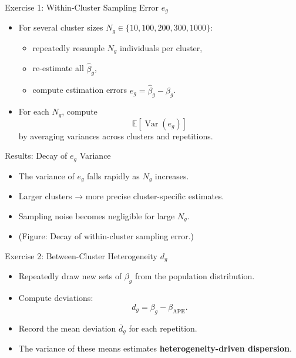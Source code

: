 \documentclass[
  ignorenonframetext,
]{beamer}
\providecommand{\tightlist}{%
  \setlength{\itemsep}{0pt}\setlength{\parskip}{0pt}}
\begin{document}
\begin{frame}{Exercise 1: Within-Cluster Sampling Error \(e_g\)}
\label{exercise-1-within-cluster-sampling-error-e_g}
\begin{itemize}
\tightlist
\item
  For several cluster sizes \(N_g \in \{10,100,200,300,1000\}\):

  \begin{itemize}
  \tightlist
  \item
    repeatedly resample \(N_g\) individuals per cluster,
  \item
    re-estimate all \(\hat{\beta}_g\),
  \item
    compute estimation errors \(e_g = \hat{\beta}_g - \beta_g\).
  \end{itemize}
\item
  For each \(N_g\), compute \[
  \mathbb{E}[\operatorname{Var}(e_g)]
  \] by averaging variances across clusters and repetitions.
\end{itemize}
\end{frame}

\begin{frame}{Results: Decay of \(e_g\) Variance}
\label{results-decay-of-e_g-variance}
\begin{itemize}
\tightlist
\item
  The variance of \(e_g\) falls rapidly as \(N_g\) increases.\\
\item
  Larger clusters → more precise cluster-specific estimates.\\
\item
  Sampling noise becomes negligible for large \(N_g\).\\
\item
  (Figure: Decay of within-cluster sampling error.)
\end{itemize}
\end{frame}

\begin{frame}{Exercise 2: Between-Cluster Heterogeneity \(d_g\)}
\label{exercise-2-between-cluster-heterogeneity-d_g}
\begin{itemize}
\tightlist
\item
  Repeatedly draw new sets of \(\beta_g\) from the population
  distribution.\\
\item
  Compute deviations: \[
  d_g = \beta_g - \beta_{\text{APE}}.
  \]
\item
  Record the mean deviation \(\overline{d}_g\) for each repetition.\\
\item
  The variance of these means estimates \textbf{heterogeneity-driven
  dispersion}.
\end{itemize}
\end{frame}
\end{document}
